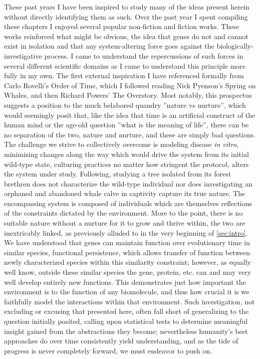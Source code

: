 
These past years I have been inspired to study many of the ideas present herein without directly identifying them as such. Over the past year I spent compiling these chapters I enjoyed several popular non-fiction and fiction works. These works reinforced what might be obvious, the idea that genes do not and cannot exist in isolation and that any system-altering force goes against the biologically-investigative process. I came to understand the repercussions of such forces in several different scientific domains as I came to understand this principle more fully in my own. The first external inspiration I have referenced formally from Carlo Rovelli's Order of Time\cite{rovelli}, which I followed reading Nick Pyenson's Spying on Whales\cite{pyenson},  and then Richard Powers' The Overstory\cite{powers}. Most notably, this prospectus suggests a position to the much belabored quandry ''nature vs nurture'', which would seemingly posit that, like the idea that time is an artificial construct of the human mind or the age-old question ''what is the meaning of life'', there can be no separation of the two, nature and nurture, and these are simply bad questions. The challenge we strive to collectively overcome is modeling disease \emph{in vitro}, minimizing changes along the way which would drive the system from its initial wild-type state, \ie culturing practices no matter how stringent the protocol, alters the system under study. Following, studying a tree isolated from its forest brethren does not characterize the wild-type individual nor does investigating an orphaned and abandoned whale calve in captivity capture its true nature. The encompassing system is composed of individuals which are themselves reflections of the constraints dictated by the environment. More to the point, there is no suitable nature without a nurture for it to grow and thrive within, the two are inextricably linked, as previously alluded to in the very beginning of \cref{sec:intro}. We have understood that genes can maintain function over evolutionary time in similar species, \ie functional persistence, which allows transfer of function between newly characterized species within this similarity constraint; however, as equally well know, outside these similar species the gene, protein, etc. can and may very well develop entirely new functions. This demonstrates just how important the environment is to the function of any biomolecule, and thus how crucial it is we faithfully model the interactions within that environment. Such investigation, not excluding or excusing that presented here, often fall short of generalizing to the question initially posited, calling upon statistical tests to determine meaningful insight gained from the abstractions they become; nevertheless humanity's best approaches do over time consistently yield understanding, and as the tide of progress is never completely forward, we must endeavor to push on.

